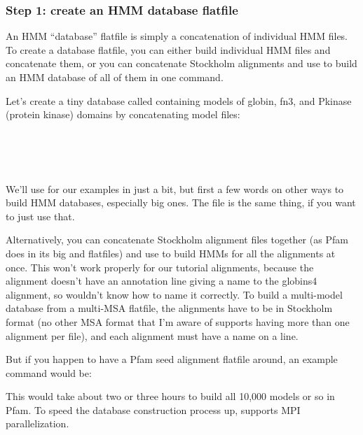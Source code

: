 \subsubsection{Step 1: create an HMM database flatfile}

An HMM ``database'' flatfile is simply a concatenation of individual
HMM files. To create a database flatfile, you can either build
individual HMM files and concatenate them, or you can concatenate
Stockholm alignments and use  to build an HMM database
of all of them in one command. 

Let's create a tiny database called  containing models
of globin, fn3, and Pkinase (protein kinase) domains by concatenating
model files:

\\
\\
\\

We'll use  for our examples in just a bit, but first a
few words on other ways to build HMM databases, especially big ones.
The file  is the same thing, if you want to
just use that.

Alternatively, you can concatenate Stockholm alignment files together
(as Pfam does in its big  and 
flatfiles) and use  to build HMMs for all the
alignments at once. This won't work properly for our tutorial
alignments, because the  alignment doesn't have an
 annotation line giving a name to the globins4
alignment, so  wouldn't know how to name it
correctly. To build a multi-model database from a multi-MSA flatfile,
the alignments have to be in Stockholm format (no other MSA format
that I'm aware of supports having more than one alignment per file),
and each alignment must have a name on a  line.

But if you happen to have a Pfam seed alignment flatfile
 around, an example command would be:


This would take about two or three hours to build all 10,000 models or
so in Pfam.  To speed the database construction process up,
 supports MPI parallelization. 

